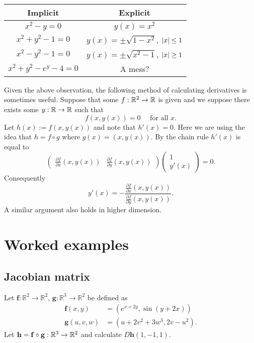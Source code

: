 \begin{center}
    \begin{tabular}{c | c}
        \textbf{Implicit}     & \textbf{Explicit}                              \\
        \hline
        \(x^2-y=0\)           & \(y(x) = x^2\)                                 \\
        \(x^2+y^2-1=0\)       & \(y(x) = \pm \sqrt{1-x^2}\), \(\left|x\right|\leq 1\) \\
        \(x^2-y^2-1=0\)       & \(y(x) = \pm \sqrt{x^2-1}\), \(\left|x\right|\geq 1\) \\
        \(x^2+y^2-e^y -4 =0\) & A mess?
    \end{tabular}
\end{center}

Given the above observation, the following method of calculating derivatives is sometimes useful.
Suppose that some \(f:\mathbb{R}^2 \to \mathbb{R}\) is given and we suppose there exists some \(y:\mathbb{R}\to\mathbb{R}\) such that
\[
    f(x,y(x))=0 \quad \text{ for all \(x\)}.
\]
Let \(h(x):= f(x,y(x))\) and note that \(h'(x)=0\).
Here we are using the idea that \(h = f \circ g\) where \(g(x) = (x,y(x))\).
By the chain rule \( h'(x)\) is equal to
\[
    \begin{pmatrix}
        \frac{\partial f}{\partial x}(x,y(x)) & \frac{\partial f}{\partial y}(x,y(x))
    \end{pmatrix}
    \begin{pmatrix}
        1 \\
        y'(x)
    \end{pmatrix}
    =0.
\]
Consequently
\[
    y'(x) = - \frac{ \frac{\partial f}{\partial x}(x,y(x)) }{ \frac{\partial f}{\partial y}(x,y(x)) }.
\]
A similar argument also holds in higher dimension.


\section*{Worked examples}

\subsection*{Jacobian matrix}

\question
Let $\mathbf{f}:\mathbb{R}^2\to\mathbb{R}^2$, $\mathbf{g}:\mathbb{R}^3\to\mathbb{R}^2$ be defined as
\[
    \begin{aligned}
        \mathbf{f}(x,y) &= (e^{x+2y}, \sin(y+2x)) \\
        \mathbf{g}(u,v,w) &= (u+2v^2+3w^3,2v-u^2).
    \end{aligned}
\]
Let $\mathbf{h} =\mathbf{f} \circ \mathbf{g} : \mathbb{R}^3 \to \mathbb{R}^2$ and calculate \(D\mathbf{h}(1,-1,1)\).

